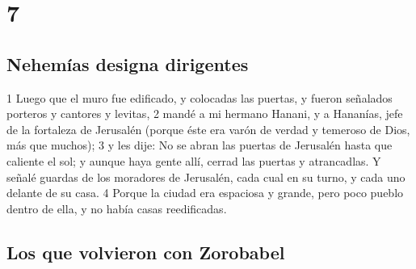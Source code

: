 \chapter{7}

\section*{Nehemías designa dirigentes}


1 Luego que el muro fue edificado, y colocadas las puertas, y fueron señalados porteros y cantores y levitas,
2 mandé a mi hermano Hanani, y a Hananías, jefe de la fortaleza de Jerusalén (porque éste era varón de verdad y temeroso de Dios, más que muchos);
3 y les dije: No se abran las puertas de Jerusalén hasta que caliente el sol; y aunque haya gente allí, cerrad las puertas y atrancadlas. Y señalé guardas de los moradores de Jerusalén, cada cual en su turno, y cada uno delante de su casa.
4 Porque la ciudad era espaciosa y grande, pero poco pueblo dentro de ella, y no había casas reedificadas.
\section*{Los que volvieron con Zorobabel}


